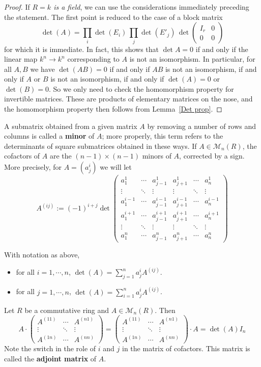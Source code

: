 \begin{proof}
If \textit{$R=k$ is a field}, we can use the considerations immediately preceding the statement. The first point is reduced to the case of a block matrix 
\[\det(A)=\prod_i\det(E_i)\,\prod_j\det(E'_j)\,\det\begin{pmatrix}
I_r&0\\
0&0
\end{pmatrix}\]
for which it is immediate. In fact, this shows that $\det A=0$ if and only if the linear map $k^n\to k^n$ corresponding to $A$ is not an isomorphism. In particular, for all $A,B$ we have $\det(AB)=0$ if and only if $AB$ is not an isomorphism, if and only if $A$ or $B$ is not an isomorphism, if and only if $\det(A)=0$ or $\det(B)=0$. So we only need to check the homomorphism property for invertible matrices. These are products of elementary matrices on the nose, and the homomorphism property then follows from Lemma~\ref{Det prop}.
\end{proof}
A submatrix obtained from a given matrix $A$ by removing a number of rows and columns is called a \textbf{minor} of $A$; more properly, this term refers to the determinants of square submatrices obtained in these ways. If $A\in\mathcal{M}_n(R)$, the cofactors of $A$ are the $(n-1)\times(n-1)$ minors of $A$, corrected by a sign. More precisely, for $A=(a^i_j)$ we will let
\[A^{(ij)}:=(-1)^{i+j}\det\begin{pmatrix}
a^1_1&\cdots &a^1_{j-1}&a^1_{j+1}&\cdots&a^1_n\\
\vdots&\ddots&\vdots&\vdots&\ddots&\vdots\\
a^{i-1}_1&\cdots&a^{i-1}_{j-1}&a^{i-1}_{j+1}&\cdots&a^{i-1}_{n}\\
a^{i+1}_1&\cdots&a^{i+1}_{j-1}&a^{i+1}_{j+1}&\cdots&a^{i+1}_{n}\\
\vdots&\ddots&\vdots&\vdots&\ddots&\vdots\\
a^n_1&\cdots &a^n_{j-1}&a^n_{j+1}&\cdots&a^n_n
\end{pmatrix}\]
\begin{lemma}\label{det expan}
With notation as above,
\begin{itemize}
\item for all $i=1,\cdots, n$, $\det(A)=\sum_{j=1}^{n}a^i_jA^{(ij)}$.
\item for all $j=1,\cdots, n$, $\det(A)=\sum_{i=1}^{n}a^i_jA^{(ij)}$.
\end{itemize}
\end{lemma}
\begin{corollary}\label{Matr adj}
Let $R$ be a commutative ring and $A\in\mathcal{M}_n(R)$. Then
\[A\cdot\begin{pmatrix}
A^{(11)}&\cdots&A^{(n1)}\\
\vdots&\ddots&\vdots\\
A^{(1n)}&\cdots&A^{(nn)}
\end{pmatrix}=\begin{pmatrix}
A^{(11)}&\cdots& A^{(n1)}\\
\vdots&\ddots&\vdots\\
A^{(1n)}&\cdots&A^{(nn)}
\end{pmatrix}\cdot A=\det(A)I_n\]
Note the switch in the role of $i$ and $j$ in the matrix of cofactors. This matrix is called the \textbf{adjoint matrix} of $A$.
\end{corollary}
